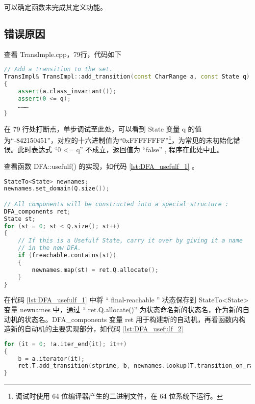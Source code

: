 可以确定函数未完成其定义功能。

\subsection{错误原因}

查看 TransImple.cpp，79行，代码如下

\begin{lstlisting}[language=C++,label={lst:TransImple},caption={ TransImple.cpp },firstnumber=75]
// Add a transition to the set.
TransImpl& TransImpl::add_transition(const CharRange a, const State q)
{
    assert(a.class_invariant());
    assert(0 <= q);
    ………
}
\end{lstlisting}

在 79 行处打断点，单步调试至此处，可以看到 State 变量 q 的值为“-842150451”，对应的十六进制值为“0xFFFFFFFF”\footnote{调试时使用 64 位编译器产生的二进制文件，在 64 位系统下运行。}，为常见的未初始化错误。此时表达式 “0 <= q” 不成立，返回值为 “false” , 程序在此处中止。

查看函数 DFA::usefulf() 的实现，如代码 \ref{lst:DFA_usefulf_1} 。

\begin{lstlisting}[language=C++,label={lst:DFA_usefulf_1},caption={ DFA.cpp },firstnumber=84]
StateTo<State> newnames;
newnames.set_domain(Q.size());

// All components will be constructed into a special structure :
DFA_components ret;
State st;
for (st = 0; st < Q.size(); st++)
{
    // If this is a Usefulf State, carry it over by giving it a name
    // in the new DFA.
    if (freachable.contains(st))
    {
        newnames.map(st) = ret.Q.allocate();
    }
}
\end{lstlisting}
在代码 \ref{lst:DFA_usefulf_1} 中将 “ final-reachable ” 状态保存到 StateTo<State> 变量 newnames 中，通过 “ ret.Q.allocate()” 为状态命名新的状态名，作为新的自动机的状态名。DFA\_components 变量 ret 用于构建新的自动机，再看函数内构造新的自动机的主要实现部分，如代码 \ref{lst:DFA_usefulf_2}

\begin{lstlisting}[language=C++,label={lst:DFA_usefulf_2},caption={ DFA.cpp },firstnumber=130]
for (it = 0; !a.iter_end(it); it++)
{
    b = a.iterator(it);
    ret.T.add_transition(stprime, b, newnames.lookup(T.transition_on_range(st, b)));
}
\end{lstlisting}

